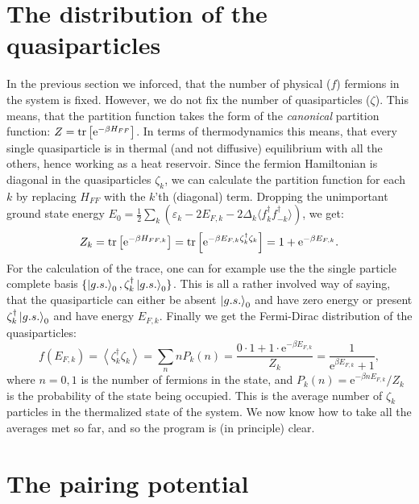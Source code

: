 \section{The distribution of the quasiparticles}
In the previous section we inforced, that the number of physical ($f$) fermions in the system is fixed. However, we do not fix the number of quasiparticles ($\zeta$). This means, that the partition function takes the form of the \textit{canonical} partition function: $Z = \operatorname{tr}\left[\text{e}^{-\beta H_{FF}}\right]$. In terms of thermodynamics this means, that every single quasiparticle is in thermal (and not diffusive) equilibrium with all the others, hence working as a heat reservoir. Since the fermion Hamiltonian is diagonal in the quasiparticles $\zeta_k$, we can calculate the partition function for each $k$ by replacing $H_{FF}$ with the $k$'th (diagonal) term. Dropping the unimportant ground state energy $E_0 = \frac{1}{2}\sum_k (\varepsilon_k-2E_{F,k}-2\Delta_k\langle f^\dagger_k f^\dagger_{-k}\rangle)$, we get:
\begin{equation}
Z_k = \operatorname{tr}\left[\text{e}^{-\beta H_{FF,k}}\right] = \operatorname{tr}\left[\text{e}^{-\beta E_{F,k}\zeta^\dagger_k\zeta_k }\right] = 1 + \text{e}^{-\beta E_{F,k}}. 
\end{equation}     
For the calculation of the trace, one can for example use the the single particle complete basis $\{\ket{g.s.}_0, \zeta^\dagger_k\ket{g.s.}_0 \}$. This is all a rather involved way of saying, that the quasiparticle can either be absent $\ket{g.s.}_0$ and have zero energy or present $\zeta^\dagger_k\ket{g.s.}_0$ and have energy $E_{F,k}$. Finally we get the Fermi-Dirac distribution of the quasiparticles:
\begin{equation}
f(E_{F,k}) = \left\langle \zeta^\dagger_k\zeta_k \right\rangle = \sum_n n P_k(n) = \frac{0\cdot 1 + 1 \cdot \text{e}^{-\beta E_{F,k}} }{Z_k} = \frac{1}{\text{e}^{\beta E_{F,k}} + 1}, 
\end{equation}
where $n=0,1$ is the number of fermions in the state, and $P_k(n) = \text{e}^{-\beta n E_{F,k}}/Z_k$ is the probability of the state being occupied\cite{PlischkeStatPhys,SchroederThermal}. This is the average number of $\zeta_k$ particles in the thermalized state of the system. We now know how to take all the averages met so far, and so the program is (in principle) clear.  

\section{The pairing potential} \label{sec.pairingpotential}
